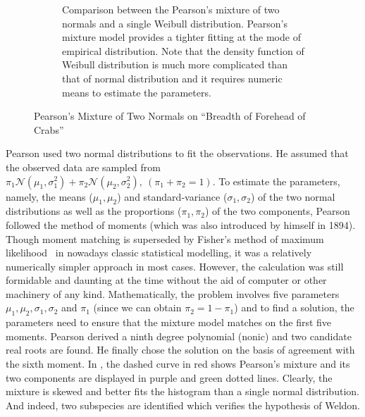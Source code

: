 \begin{figure}[ht!]
\begin{subfigure}[b]{0.95\textwidth}
  \caption{Comparison between the Pearson's mixture of two normals and a single
    Weibull distribution. Pearson's mixture model provides a tighter fitting at
    the mode of empirical distribution. Note that the density function of
    Weibull distribution is much more complicated than that of normal
    distribution and it requires numeric means to estimate the parameters.}
  \label{fig::pearson-crab-weibull}
  \end{subfigure}
  \caption{Pearson's Mixture of Two Normals on ``Breadth of Forehead of Crabs''}
\end{figure}

Pearson used two normal distributions to fit the observations. He assumed that
the observed data are sampled from $\pi_1 \mathcal{N}(\mu_1, \sigma_1^2) + \pi_2
\mathcal{N}(\mu_2, \sigma_2^2),~(\pi_1 + \pi_2 = 1)$. To estimate the
parameters, namely, the means ($\mu_1, \mu_2$) and standard-variance ($\sigma_1,
\sigma_2$) of the two normal distributions as well as the proportions ($\pi_1,
\pi_2$) of the two components, Pearson followed the method of moments (which was
also introduced by himself in 1894). Though moment matching is superseded by
Fisher's method of maximum likelihood~\cite{pfanzagl1994parametric} in nowadays
classic statistical modelling, it was a relatively numerically simpler approach
in most cases. However, the calculation was still formidable and daunting at the
time without the aid of computer or other machinery of any kind.
Mathematically, the problem involves five parameters $\mu_1, \mu_2, \sigma_1,
\sigma_2$ and $\pi_1$ (since we can obtain $\pi_2 = 1 - \pi_1$) and to find a
solution, the parameters need to ensure that the mixture model matches on the
first five moments. Pearson derived a ninth degree polynomial (nonic) and two
candidate real roots are found. He finally chose the solution on the basis of
agreement with the sixth moment. In , the dashed curve
in red shows Pearson's mixture and its two components are displayed in purple
and green dotted lines. Clearly, the mixture is skewed and better fits the
histogram than a single normal distribution. And indeed, two subspecies are
identified which verifies the hypothesis of Weldon.

